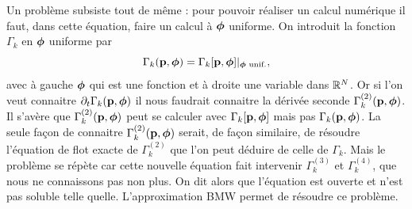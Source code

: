 \documentclass[10.5pt]{article}
\begin{document}
\begin{multicols*}{2}
Un problème subsiste tout de même : pour pouvoir réaliser un calcul numérique il faut, dans cette équation, faire un calcul à $\boldsymbol{ \phi}$ uniforme.
On introduit la fonction $\Gamma_k$ en $\boldsymbol{ \phi}$ uniforme par
\begin{equation}
\Gamma_k({\bf p}, \boldsymbol{ \phi}) = \Gamma_k[{\bf p}, \boldsymbol{ \phi}]|_{\boldsymbol{ \phi} \text{ unif.}}, 
\end{equation}
avec à gauche $\boldsymbol{ \phi}$ qui est une fonction et à droite une variable dans $\mathbb{R}^N$. Or si l'on veut connaitre $\partial_t \Gamma_k({\bf p}, \boldsymbol{ \phi})$ il nous faudrait connaitre la dérivée seconde $\Gamma_k^{(2)}({\bf p}, \boldsymbol{ \phi})$. Il s'avère que $\Gamma_k^{(2)} ({\bf p}, \boldsymbol{ \phi})$ peut se calculer avec $\Gamma_k[{\bf p}, \boldsymbol{ \phi}]$ mais pas $\Gamma_k({\bf p}, \boldsymbol{ \phi})$. La seule façon de connaitre $\Gamma_k^{(2)}({\bf p}, \boldsymbol{ \phi})$ serait, de façon similaire, de résoudre l'équation de flot exacte de $\Gamma_k^{(2)}$ que l'on peut déduire de celle de $\Gamma_k$. Mais le problème se répète car cette nouvelle équation fait intervenir $\Gamma_k^{(3)}$ et $\Gamma_k^{(4)}$, que nous ne connaissons pas non plus. On dit alors que l'équation est ouverte et n'est pas soluble telle quelle. L'approximation BMW permet de résoudre ce problème. 


\vspace*{11pt}

\end{multicols*}
\end{document}
